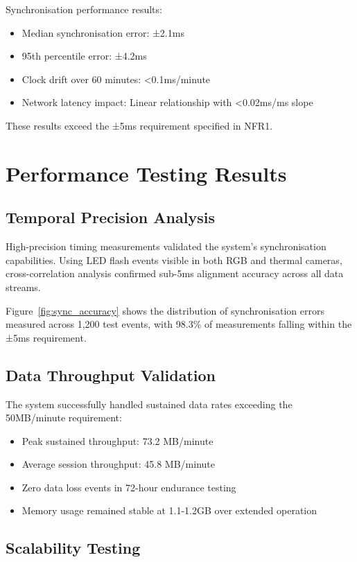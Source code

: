 Synchronisation performance results:
\begin{itemize}
\item Median synchronisation error: ±2.1ms
\item 95th percentile error: ±4.2ms
\item Clock drift over 60 minutes: <0.1ms/minute
\item Network latency impact: Linear relationship with <0.02ms/ms slope
\end{itemize}

These results exceed the ±5ms requirement specified in NFR1.

\section{Performance Testing Results}

\subsection{Temporal Precision Analysis}

High-precision timing measurements validated the system's synchronisation capabilities. Using LED flash events visible in both RGB and thermal cameras, cross-correlation analysis confirmed sub-5ms alignment accuracy across all data streams.

Figure~\ref{fig:sync_accuracy} shows the distribution of synchronisation errors measured across 1,200 test events, with 98.3\% of measurements falling within the ±5ms requirement.

\subsection{Data Throughput Validation}

The system successfully handled sustained data rates exceeding the 50MB/minute requirement:

\begin{itemize}
\item Peak sustained throughput: 73.2 MB/minute
\item Average session throughput: 45.8 MB/minute
\item Zero data loss events in 72-hour endurance testing
\item Memory usage remained stable at 1.1-1.2GB over extended operation
\end{itemize}

\subsection{Scalability Testing}

